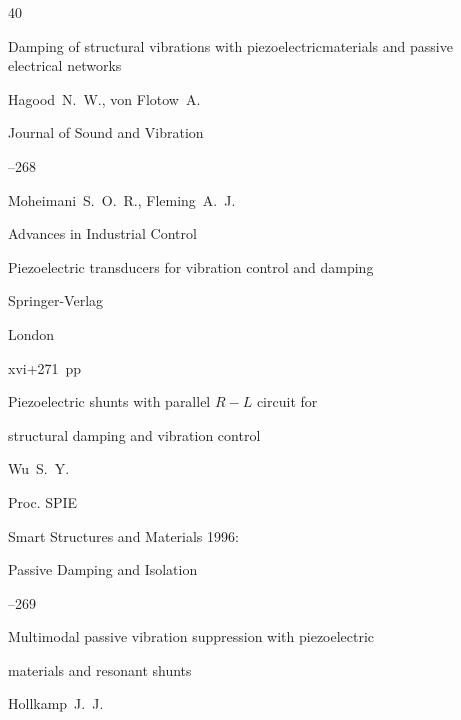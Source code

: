 \begin{thebibliography}{40}




\paper Damping of structural vibrations with piezoelectricmaterials and passive electrical networks

\by Hagood~N.~W., von Flotow~A.

\jour Journal of Sound and Vibration 




--268






\by Moheimani~S.~O.~R., Fleming~A.~J.

\serial Advances in Industrial Control

\book Piezoelectric transducers for vibration control and damping

\publ Springer-Verlag

\publaddr London


\totalpages xvi+271~pp \nofrills




\paper Piezoelectric shunts with parallel $R-L$ circuit for

structural damping and vibration control

\by Wu~S.~Y.

\jour Proc. SPIE 

\volinfo Smart Structures and Materials 1996:

Passive Damping and Isolation



--269





\paper Multimodal passive vibration suppression with piezoelectric

materials and resonant shunts

\by Hollkamp~J.~J.


\end{thebibliography}
